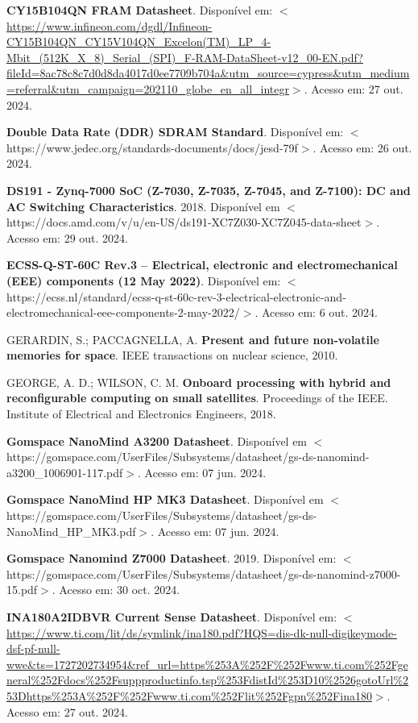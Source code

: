 \begin{flushleft}
\begin{thebibliography}{00}
 \textbf{CY15B104QN FRAM Datasheet}. Disponível em: $<$\url{https://www.infineon.com/dgdl/Infineon-CY15B104QN\_CY15V104QN\_Excelon(TM)\_LP\_4-Mbit\_(512K\_X\_8)\_Serial\_(SPI)\_F-RAM-DataSheet-v12\_00-EN.pdf?fileId=8ac78c8c7d0d8da4017d0ee7709b704a\&utm\_source=cypress\&utm\_medium=referral\&utm\_campaign=202110\_globe\_en\_all\_integr}$>$. Acesso em: 27 out. 2024.

 \textbf{Double Data Rate (DDR) SDRAM Standard}. Disponível em: $<$https://www.jedec.org/standards-documents/docs/jesd-79f$>$. Acesso em: 26 out. 2024.

 \textbf{DS191 - Zynq-7000 SoC (Z-7030, Z-7035, Z-7045, and Z-7100): DC and AC Switching Characteristics}. 2018. Disponível em $<$https://docs.amd.com/v/u/en-US/ds191-XC7Z030-XC7Z045-data-sheet$>$. Acesso em: 29 out. 2024.

 \textbf{ECSS-Q-ST-60C Rev.3 – Electrical, electronic and electromechanical (EEE) components (12 May 2022)}. Disponível em: $<$https://ecss.nl/standard/ecss-q-st-60c-rev-3-electrical-electronic-and-electromechanical-eee-components-2-may-2022/$>$. Acesso em: 6 out. 2024.

 GERARDIN, S.; PACCAGNELLA, A. \textbf{Present and future non-volatile memories for space}. IEEE transactions on nuclear science, 2010.

 GEORGE, A. D.; WILSON, C. M. \textbf{Onboard processing with hybrid and reconfigurable computing on small satellites}. Proceedings of the IEEE. Institute of Electrical and Electronics Engineers, 2018.

 \textbf{Gomspace NanoMind A3200 Datasheet}. Disponível em $<$https://gomspace.com/UserFiles/Subsystems/datasheet/gs-ds-nanomind-a3200\_1006901-117.pdf$>$. Acesso em: 07 jun. 2024.

 \textbf{Gomspace NanoMind HP MK3 Datasheet}. Disponível em $<$https://gomspace.com/UserFiles/Subsystems/datasheet/gs-ds-NanoMind\_HP\_MK3.pdf$>$. Acesso em: 07 jun. 2024.

 \textbf{Gomspace Nanomind Z7000 Datasheet}. 2019. Disponível em: $<$https://gomspace.com/UserFiles/Subsystems/datasheet/gs-ds-nanomind-z7000-15.pdf$>$. Acesso em: 30 oct. 2024.

 \textbf{INA180A2IDBVR Current Sense Datasheet}. Disponível em: $<$\url{https://www.ti.com/lit/ds/symlink/ina180.pdf?HQS=dis-dk-null-digikeymode-dsf-pf-null-wwe\&ts=1727202734954\&ref\_url=https\%253A\%252F\%252Fwww.ti.com\%252Fgeneral\%252Fdocs\%252Fsuppproductinfo.tsp\%253FdistId\%253D10\%2526gotoUrl\%253Dhttps\%253A\%252F\%252Fwww.ti.com\%252Flit\%252Fgpn\%252Fina180}$>$. Acesso em: 27 out. 2024. 


\end{thebibliography}
\end{flushleft}
